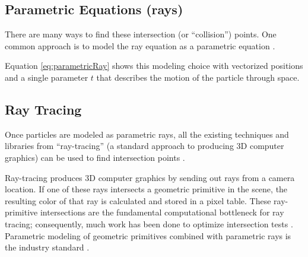 	\subsection{Parametric Equations (rays)}

There are many ways to find these intersection (or ``collision'') points. One common approach is to model the ray equation as a parametric equation \cite{purcell2002ray}.


 {
	\label{eq:parametricRay}
}

Equation \eqref{eq:parametricRay} shows this modeling choice with vectorized positions and a single parameter $t$ that describes the motion of the particle through space.


	\subsection{Ray Tracing}

Once particles are modeled as parametric rays, all the existing techniques and libraries from ``ray-tracing'' (a standard approach to producing 3D computer graphics) can be used to find intersection points \cite{purcell2002ray}.

Ray-tracing produces 3D computer graphics by sending out rays from a camera location. If one of these rays intersects a geometric primitive in the scene, the resulting color of that ray is calculated and stored in a pixel table. These ray-primitive intersections are the fundamental computational bottleneck for ray tracing; consequently, much work has been done to optimize intersection tests \cite{purcell2002ray}. Parametric modeling of geometric primitives combined with parametric rays is the industry standard \cite{glassner1989introduction}.



